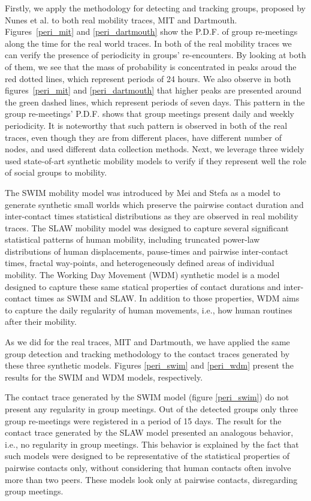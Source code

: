 \documentclass[10pt, conference, letterpaper]{IEEEtran}
\begin{document}
Firstly, we apply the methodology for detecting and tracking groups, proposed by Nunes et al. \cite{icc} to both real mobility traces, MIT and Dartmouth. Figures~\ref{peri_mit} and \ref{peri_dartmouth} show the P.D.F. of group re-meetings along the time for the real world traces. In both of the real mobility traces we can verify the presence of periodicity in groups' re-encounters. By looking at both of them, we see that the mass of probability is concentrated in peaks aroud the red dotted lines, which represent periods of 24 hours. We also observe in both figures~\ref{peri_mit} and \ref{peri_dartmouth} that higher peaks are presented around the green dashed lines, which represent periods of seven days. This pattern in the group re-meetings' P.D.F. shows that group meetings present daily and weekly periodicity. It is noteworthy that such pattern is observed in both of the real traces, even though they are from different places, have different number of nodes, and used different data collection methods. Next, we leverage three widely used state-of-art synthetic mobility models to verify if they represent well the role of social groups to mobility.

The SWIM mobility model was introduced by Mei and Stefa \cite{swim} as a model to generate synthetic small worlds which preserve the pairwise contact duration and inter-contact times statistical distributions as they are observed in real mobility traces. The SLAW mobility model \cite{slaw} was designed to capture several significant statistical patterns of human mobility, including truncated power-law distributions of human displacements, pause-times and pairwise inter-contact times, fractal way-points, and heterogeneously defined areas of individual mobility. The Working Day Movement (WDM) synthetic model \cite{wdm} is a model designed to capture these same statical properties of contact durations and inter-contact times as SWIM and SLAW. In addition to those properties, WDM aims to capture the daily regularity of human movements, i.e., how human routines after their mobility.

As we did for the real traces, MIT and Dartmouth, we have applied the same group detection and tracking methodology to the contact traces generated by these three synthetic models. Figures \ref{peri_swim} and \ref{peri_wdm} present the results for the SWIM and WDM models, respectively.

The contact trace generated by the SWIM model (figure \ref{peri_swim}) do not present any regularity in group meetings. Out of the detected groups only three group re-meetings were registered in a period of 15 days. The result for the contact trace generated by the SLAW model presented an analogous behavior, i.e., no regularity in group meetings. This behavior is explained by the fact that such models were designed to be representative of the statistical properties of pairwise contacts only, without considering that human contacts often involve more than two peers. These models look only at pairwise contacts, disregarding group meetings.
\end{document}
